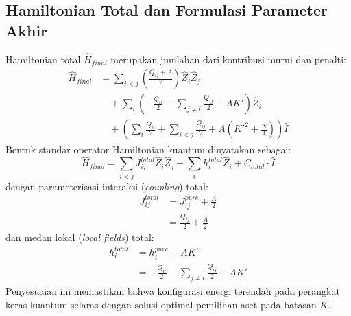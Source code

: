 \subsection{Hamiltonian Total dan Formulasi Parameter Akhir}
Hamiltonian total $\hat{H}_{final}$ merupakan jumlahan dari kontribusi murni dan penalti:
\begin{equation}
\begin{split}
\hat{H}_{final} &= \sum_{i<j} \left( \frac{Q_{ij} + A}{2} \right) \hat{Z}_i \hat{Z}_j \\
&\quad + \sum_i \left( -\frac{Q_{ii}}{2} - \sum_{j \neq i} \frac{Q_{ij}}{2} - A K' \right) \hat{Z}_i \\
&\quad + \left( \sum_i \frac{Q_{ii}}{2} + \sum_{i<j} \frac{Q_{ij}}{2} + A\left(K'^2 + \frac{N}{4}\right) \right) \hat{I}
\end{split}
\label{eq:ising_full_substitution_appendix}
\end{equation}
Bentuk standar operator Hamiltonian kuantum dinyatakan sebagai:
\begin{equation}
\hat{H}_{final} = \sum_{i<j} J_{ij}^{total} \hat{Z}_i \hat{Z}_j + \sum_i h_i^{total} \hat{Z}_i + C_{total} \cdot \hat{I}
\end{equation}
dengan parameterisasi interaksi (\textit{coupling}) total:
\begin{equation}
\begin{aligned}
J_{ij}^{total} &= J_{ij}^{pure} + \frac{A}{2} \\
&= \frac{Q_{ij}}{2} + \frac{A}{2}
\end{aligned}
\end{equation}
dan medan lokal (\textit{local fields}) total:
\begin{equation}
\begin{aligned}
h_i^{total} &= h_i^{pure} - A K' \\
&= -\frac{Q_{ii}}{2} - \sum_{j \neq i} \frac{Q_{ij}}{2} - A K'
\end{aligned}
\end{equation}
Penyesuaian ini memastikan bahwa konfigurasi energi terendah pada perangkat keras kuantum selaras dengan solusi optimal pemilihan aset pada batasan $K$.
